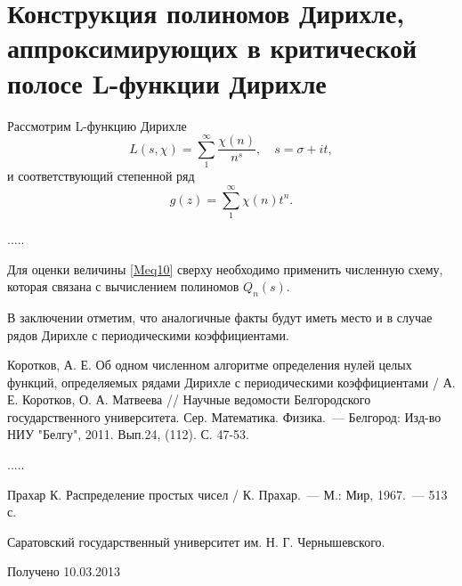 \newpage
\section{Конструкция полиномов Дирихле, аппроксимирующих
в критической полосе L-функции Дирихле}
Рассмотрим L-функцию Дирихле
\begin{equation}
L(s, \chi) = \sum_{1}^{\infty}\frac{\chi(n)}{n^s}, \quad
s = \sigma + it,
\label{Meq10}
\end{equation}
и соответствующий степенной ряд
\begin{equation}
\label{powerseries}
g(z) = \sum_{1}^{\infty}\chi(n)t^n.
\end{equation}

.....

Для оценки величины \eqref{Meq10} сверху необходимо применить
численную схему, которая связана с вычислением полиномов $Q_n(s)$.

В заключении отметим, что аналогичные факты будут иметь место
и в случае рядов
Дирихле с периодическими коэффициентами.
\begin{thebibliography}{99}
 Коротков, А. Е. Об одном численном
алгоритме определения нулей целых функций, определяемых рядами
Дирихле с периодическими коэффициентами / А. Е. Коротков,
О. А. Матвеева // Научные ведомости Белгородского государственного
университета. Сер. Математика. Физика.~--- Белгород: Изд-во
НИУ "Белгу", 2011. Вып.24, (112). С. 47-53.

.....

Прахар К. Распределение простых чисел / К. Прахар.~--- М.:
Мир, 1967.~--- 513 с.
\end{thebibliography}

\noindent Саратовский государственный университет им.
Н. Г. Чернышевского.

\noindent Получено 10.03.2013
